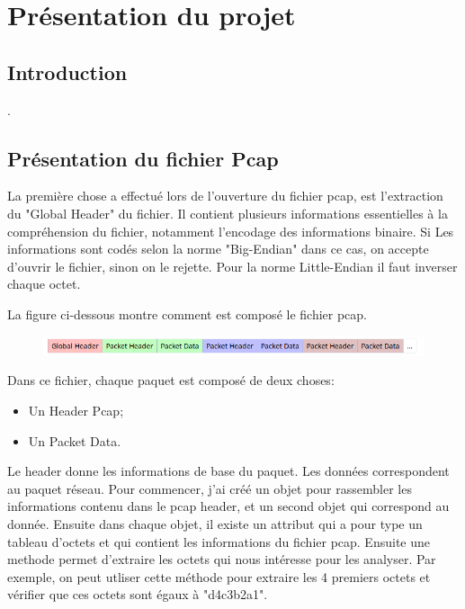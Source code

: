 \chapter{Présentation du projet}


\section{Introduction}

.


\section{Présentation du fichier Pcap}

La première chose a effectué lors de l'ouverture du fichier pcap, est l'extraction du "Global Header" du fichier.
Il contient plusieurs informations essentielles à la compréhension du fichier, notamment l'encodage des informations binaire.
Si Les informations sont codés selon la norme "Big-Endian" dans ce cas, on accepte d'ouvrir le fichier, sinon on le rejette.
Pour la norme Little-Endian il faut inverser chaque octet.

La figure ci-dessous montre comment est composé le fichier pcap.
\begin{figure}[!h]
    \begin{center}
\includegraphics[width=15cm]{./globalHeader.png}
    \end{center}
\end{figure}

Dans ce fichier, chaque paquet est composé de deux choses:
\begin{itemize}
    \item Un Header Pcap;
    \item Un Packet Data.
\end{itemize}       
Le header donne les informations de base du paquet.
Les données correspondent au paquet réseau. 
Pour commencer, j'ai créé un objet pour rassembler les informations contenu dans le pcap header, et un second objet qui correspond au donnée.
Ensuite dans chaque objet, il existe un attribut qui a pour type un tableau d'octets et qui contient les informations du fichier pcap.
Ensuite une methode permet d'extraire les octets qui nous intéresse pour les analyser.
Par exemple, on peut utliser cette méthode pour extraire les 4 premiers octets et vérifier que ces octets sont égaux à "d4c3b2a1".


